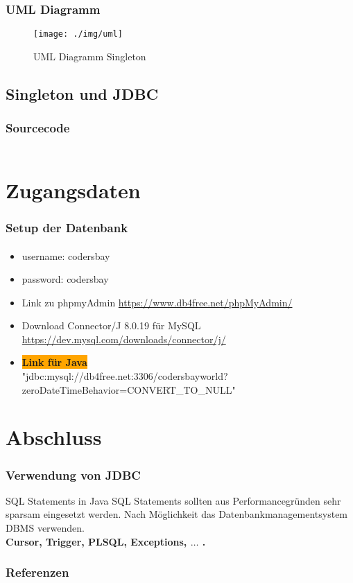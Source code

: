 \documentclass[class=beamer, crop=false]{standalone}
\begin{document}
\begin{frame}
	\frametitle{UML Diagramm}
\begin{center}
	\begin{figure}
  		\texttt{[image: ./img/uml]}
  		\caption{UML Diagramm Singleton}
  		\label{UML Diagramm Singleton}
	\end{figure}
	\cite{architektur}
	\end{center}
\end{frame}

\subsection{Singleton und JDBC}

\begin{frame}
	\frametitle{Sourcecode}
	\framesubtitle{}
	\inputminted{java}{/Users/lukas/NetBeansProjects/SQLApplication/src/sqlapplication/Singleton.java}	
	\end{frame}

\section{Zugangsdaten}
\begin{frame}
	\frametitle{Setup der Datenbank}
	\framesubtitle{}
	\begin{itemize}
		\item username: codersbay
		\item password: codersbay
		\item Link zu phpmyAdmin \url{https://www.db4free.net/phpMyAdmin/}
		\item Download Connector/J 8.0.19 für MySQL 
		\url{https://dev.mysql.com/downloads/connector/j/}
		
		\item \colorbox{orange}{\textbf{Link für Java}}\\ "jdbc:mysql://db4free.net:3306/codersbayworld?\\zeroDateTimeBehavior=CONVERT\_TO\_NULL"
	\end{itemize}
\end{frame}
\section{Abschluss}
\begin{frame}
\frametitle{Verwendung von JDBC}
	\begin{block}{SQL Statements in Java}
		SQL Statements sollten aus Performancegründen sehr sparsam eingesetzt werden. Nach Möglichkeit das Datenbankmanagementsystem DBMS verwenden. \\
		\textbf{Cursor, Trigger, PLSQL, Exceptions, $\ldots$ .}
	\end{block}

\end{frame}

\begin{frame}
\frametitle{Referenzen}
        
        
\end{frame}
\end{document}
